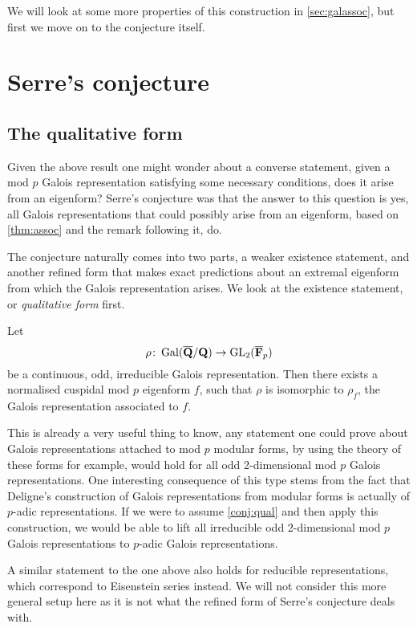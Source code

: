 \documentclass[a4paper,12pt]{article}
\begin{document}
We will look at some more properties of this construction in \cref{sec:galassoc}, but first we move on to the conjecture itself.


\section{Serre's conjecture}
\subsection{The qualitative form}
Given the above result one might wonder about a converse statement, given a mod $p$ Galois representation satisfying some necessary conditions, does it arise from an eigenform?
Serre's conjecture was that the answer to this question is yes, all Galois representations that could possibly arise from an eigenform, based on \cref{thm:assoc} and the remark following it, do.

The conjecture naturally comes into two parts, a weaker existence statement, and another refined form that makes exact predictions about an extremal eigenform from which the Galois representation arises.
We look at the existence statement, or \emph{qualitative form} first.

\begin{conjecture}\label{conj:qual}
Let
\[
\rho\colon \operatorname{Gal}(\overline{\mathbf{Q}}/\mathbf{Q}) \to \operatorname{GL}_2(\overline{\mathbf{F}}_p)
\]
be a continuous, odd, irreducible Galois representation.
Then there exists a normalised cuspidal mod $p$ eigenform $f$, such that $\rho$ is isomorphic to $\rho_f$, the Galois representation associated to $f$.
\end{conjecture}

This is already a very useful thing to know, any statement one could prove about Galois representations attached to mod $p$ modular forms, by using the theory of these forms for example, would hold for all odd 2-dimensional mod $p$ Galois representations.
One interesting consequence of this type stems from the fact that Deligne's construction of Galois representations from modular forms is actually of $p$-adic representations.
If we were to assume \cref{conj:qual} and then apply this construction, we would be able to lift all irreducible odd 2-dimensional mod $p$ Galois representations to $p$-adic Galois representations.

A similar statement to the one above also holds for reducible representations, which correspond to Eisenstein series instead.
We will not consider this more general setup here as it is not what the refined form of Serre's conjecture deals with.
\end{document}
